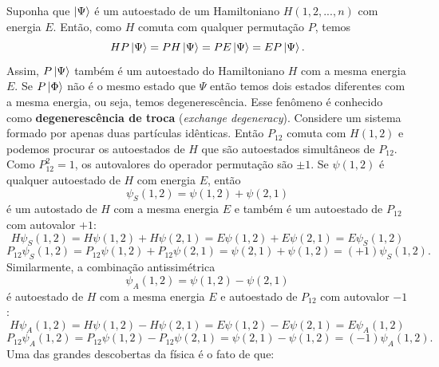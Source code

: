 \documentclass{article}
\begin{document}
Suponha que $\ket{\Psi}$ é um autoestado de um Hamiltoniano $H(1,2,...,n)$ com energia $E$. Então, como $H$ comuta com qualquer permutação $P$, temos
\begin{equation}
    HP\ket{\Psi} = PH\ket{\Psi} = PE\ket{\Psi} = EP\ket{\Psi}.
\end{equation}
Assim, $P\ket{\Psi}$ também é um autoestado do Hamiltoniano $H$ com a mesma energia $E$. Se $P\ket{\Phi}$ não é o mesmo estado que $\Psi$ então temos dois estados diferentes com a mesma energia, ou seja, temos degenerescência. Esse fenômeno é conhecido como \textbf{degenerescência de troca} (\textit{exchange degeneracy}). Considere um sistema formado por apenas duas partículas idênticas. Então $P_{12}$ comuta com $H(1,2)$ e podemos procurar os autoestados de $H$ que são autoestados simultâneos de $P_{12}$. Como $P_{12}^{2} = 1$, os autovalores do operador permutação são $\pm 1$. Se $\psi(1,2)$ é qualquer autoestado de $H$ com energia $E$, então
\begin{equation}
    \psi_S(1,2) = \psi(1,2) + \psi(2,1)
\end{equation}
é um autostado de $H$ com a mesma energia $E$ e também é um autoestado de $P_{12}$ com autovalor $+1$:
\begin{equation}
    H\psi_S(1,2) = H\psi(1,2) + H\psi(2,1) = E\psi(1,2) + E\psi(2,1) = E\psi_S(1,2)
\end{equation}
\begin{equation}
    P_{12}\psi_S(1,2) = P_{12}\psi(1,2) + P_{12}\psi(2,1) = \psi(2,1) + \psi(1,2) = (+1)\psi_S(1,2).
\end{equation}
Similarmente, a combinação antissimétrica
\begin{equation}
    \psi_A (1,2) = \psi(1,2) - \psi(2,1)
\end{equation}
é autoestado de $H$ com a mesma energia $E$ e autoestado de $P_{12}$ com autovalor $-1$:
\begin{equation}
    H\psi_A(1,2) = H\psi(1,2) - H\psi(2,1) = E\psi(1,2) - E\psi(2,1) = E\psi_A(1,2)
\end{equation}
\begin{equation}
    P_{12}\psi_A(1,2) = P_{12}\psi(1,2) - P_{12}\psi(2,1) = \psi(2,1) - \psi(1,2) = (-1)\psi_A(1,2).
\end{equation}
Uma das grandes descobertas da física é o fato de que:
\end{document}
